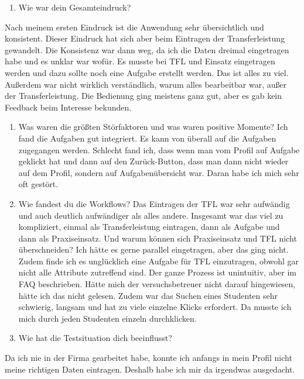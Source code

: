 \documentclass[
  12pt,
  ngerman,
  a4paper,
]{article}
\providecommand{\tightlist}{%
  \setlength{\itemsep}{0pt}\setlength{\parskip}{0pt}}
\begin{document}
\begin{enumerate}
\def\labelenumi{\arabic{enumi}.}
\tightlist
\item
  Wie war dein Gesamteindruck?
\end{enumerate}

Nach meinem ersten Eindruck ist die Anwendung sehr übersichtlich und
konsistent. Dieser Eindruck hat sich aber beim Eintragen der
Transferleistung gewandelt. Die Konsistenz war dann weg, da ich die
Daten dreimal eingetragen habe und es unklar war wofür. Es musste bei
TFL und Einsatz eingetragen werden und dazu sollte noch eine Aufgabe
erstellt werden. Das ist alles zu viel. Außerdem war nicht wirklich
verständlich, warum alles bearbeitbar war, außer der Transferleistung.
Die Bedienung ging meistens ganz gut, aber es gab kein Feedback beim
Interesse bekunden.

\begin{enumerate}
\def\labelenumi{\arabic{enumi}.}
\setcounter{enumi}{1}
\item
  Was waren die größten Störfaktoren und was waren positive Momente? Ich
  fand die Aufgaben gut integriert. Es kann von überall auf die Aufgaben
  zugegangen werden. Schlecht fand ich, dass wenn man vom Profil auf
  Aufgabe geklickt hat und dann auf den Zurück-Button, dass man dann
  nicht wieder auf dem Profil, sondern auf Aufgabenübersicht war. Daran
  habe ich mich sehr oft gestört.
\item
  Wie fandest du die Workflows? Das Eintragen der TFL war sehr aufwändig
  und auch deutlich aufwändiger als alles andere. Insgesamt war das viel
  zu kompliziert, einmal als Transferleistung eintragen, dann als
  Aufgabe und dann als Praxiseinsatz. Und warum können sich
  Praxiseinsatz und TFL nicht überschneiden? Ich hätte es gerne parallel
  eingetragen, aber das ging nicht. Zudem finde ich es unglücklich eine
  Aufgabe für TFL einzutragen, obwohl gar nicht alle Attribute
  zutreffend sind. Der ganze Prozess ist unintuitiv, aber im FAQ
  beschrieben. Hätte mich der versuchsbetreuer nicht darauf hingewiesen,
  hätte ich das nicht gelesen. Zudem war das Suchen eines Studenten sehr
  schwierig, langsam und hat zu viele einzelne Klicks erfordert. Da
  musste ich mich durch jeden Studenten einzeln durchklicken.
\item
  Wie hat die Testsituation dich beeinflusst?
\end{enumerate}

Da ich nie in der Firma gearbeitet habe, konnte ich anfangs in mein
Profil nicht meine richtigen Daten eintragen. Deshalb habe ich mir da
irgendwas ausgedacht.
\end{document}
